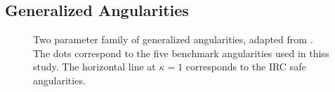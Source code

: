 \documentclass[11pt]{cernrep}
\begin{document}
\subsection{Generalized Angularities}
\label{quarkgluon_sec:genang}

\begin{figure}
\centering
{}
\caption{Two parameter family of generalized angularities, adapted from \cite{Larkoski:2014pca}.  The dots correspond to the five benchmark angularities used in thiss study.  The horizontal line at $\kappa = 1$ corresponds to the IRC safe angularities.}
\label{quarkgluon_fig:lambda_space}
\end{figure}
\end{document}
